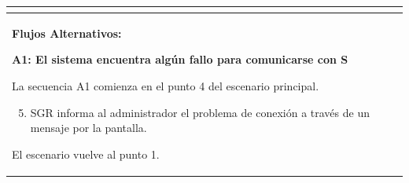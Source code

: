 \begin{longtable}{|l|p{5.5cm}|l|p{2cm}|l|p{1.9cm}|}
{					} \\ \hline

					\multicolumn{6}{|p{15cm}|}{ \textbf{Flujos Alternativos: }
					
					\textbf{A1: El sistema encuentra algún fallo para comunicarse con S}
					
					La secuencia A1 comienza en el punto 4 del escenario principal.
					\begin{enumerate}
							\setcounter{enumi}{4}
							\item SGR informa al administrador el problema de conexión a través de un mensaje por la pantalla.
					\end{enumerate}

					El escenario vuelve al punto 1.

					} \\ \hline

			\end{longtable}

